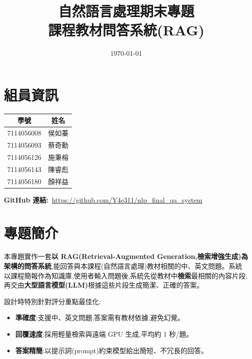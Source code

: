 \documentclass[12pt]{ctexart}
\title{\textbf{自然語言處理期末專題\\課程教材問答系統(RAG)}}
\author{}
\date{\today}
\begin{document}
\renewcommand{\contentsname}{目錄}
\renewcommand{\figurename}{圖}
\renewcommand{\tablename}{表}
\renewcommand{\appendixname}{附錄}

\maketitle

\section*{組員資訊}
\begin{center}
\begin{tabular}{cc}
\toprule
\textbf{學號} & \textbf{姓名} \\
\midrule
7114056008 & 侯如蓁 \\
7114056093 & 蔡奇勳 \\
7114056126 & 施秉榕 \\
7114056143 & 陳睿彪 \\
7114056180 & 顏祥益 \\
\bottomrule
\end{tabular}
\end{center}

\vspace{0.5em}
\noindent\textbf{GitHub 連結:}\ \url{https://github.com/Y4e311/nlp_final_qa_system}

\tableofcontents
\newpage

\section{專題簡介}
本專題實作一套\textbf{以 RAG(Retrieval-Augmented Generation,檢索增強生成)為架構的問答系統},能回答與本課程(自然語言處理)教材相關的中、英文問題。系統以課程簡報作為知識庫,使用者輸入問題後,系統先從教材中\textbf{檢索}最相關的內容片段,再交由\textbf{大型語言模型(LLM)}根據這些片段生成簡潔、正確的答案。

設計時特別針對評分重點最佳化:
\begin{itemize}[leftmargin=2em]
  \item \textbf{準確度}:支援中、英文問題,答案需有教材依據,避免幻覺。
  \item \textbf{回覆速度}:採用輕量檢索與遠端 GPU 生成,平均約 1 秒/題。
  \item \textbf{答案精簡}:以提示詞(prompt)約束模型給出簡短、不冗長的回答。
\end{itemize}
\end{document}

